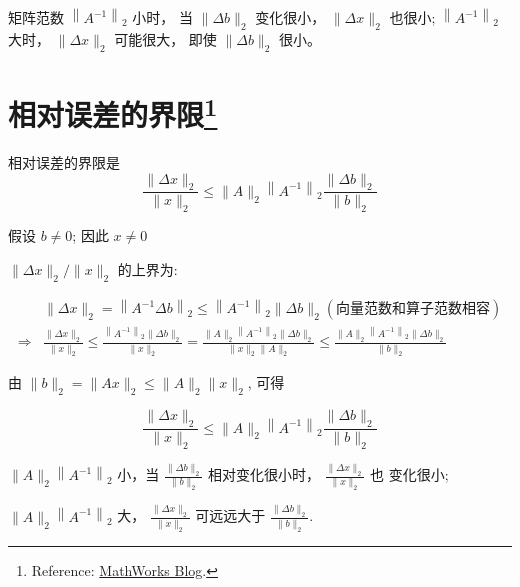 矩阵范数 $ \left\|A^{-1}\right\|_{2} $ 小时， 当 $ \|\Delta b\|_{2} $ 变化很小， $ \|\Delta x\|_{2} $ 也很小; $ \left\|A^{-1}\right\|_{2} $ 大时，  $ \|\Delta x\|_{2} $ 可能很大，  即使 $ \|\Delta b\|_{2} $ 很小。 

\section[相对误差的界限]{相对误差的界限\footnote{Reference: \href{https://blogs.mathworks.com/cleve/2017/07/17/what-is-the-condition-number-of-a-matrix/?from=cn}{MathWorks Blog}.}}

\begin{theorem}[相对误差的界限]
    相对误差的界限是
    \begin{equation} \frac{\|\Delta x\|_{2}}{\|x\|_{2}} \leq\|A\|_{2}\left\|A^{-1}\right\|_{2} \frac{\|\Delta b\|_{2}}{\|b\|_{2}} \end{equation}
\end{theorem}

假设 $ b \neq 0 $; 因此 $ x \neq 0$

$\|\Delta x\|_{2} /\|x\|_{2} $ 的上界为:

\begin{equation} 
\begin{aligned}
    &\|\Delta x\|_{2}=\left\|A^{-1} \Delta b\right\|_{2} \leq\left\|A^{-1}\right\|_{2}\|\Delta b\|_{2}(向量范数和算子范数相容)\\
    \Rightarrow& \frac{\|\Delta x\|_{2}}{\|x\|_{2}} \leq \frac{\left\|A^{-1}\right\|_{2}\|\Delta b\|_{2}}{\|x\|_{2}}=\frac{\|A\|_{2}\left\|A^{-1}\right\|_{2}\|\Delta b\|_{2}}{\|x\|_{2}\|A\|_{2}} \leq \frac{\|A\|_{2}\left\|A^{-1}\right\|_{2}\|\Delta b\|_{2}}{\|b\|_{2}}
\end{aligned}
\end{equation}

由 $ \|b\|_{2}=\|A x\|_{2} \leq\|A\|_{2}\|x\|_{2} $, 可得

\begin{equation} \frac{\|\Delta x\|_{2}}{\|x\|_{2}} \leq\|A\|_{2}\left\|A^{-1}\right\|_{2} \frac{\|\Delta b\|_{2}}{\|b\|_{2}} \end{equation}

$ \|A\|_{2}\left\|A^{-1}\right\|_{2} $ 小，当 $ \frac{\|\Delta b\|_{2}}{\|b\|_{2}}  $ 相对变化很小时， $ \frac{\|\Delta x\|_{2}}{\|x\|_{2}}  $ 也 变化很小;

$ \|A\|_{2}\left\|A^{-1}\right\|_{2} $ 大， $ \frac{\|\Delta x\|_{2}}{\|x\|_{2}}  $ 可远远大于 $ \frac{\|\Delta b\|_{2}}{\|b\|_{2}}  $.



